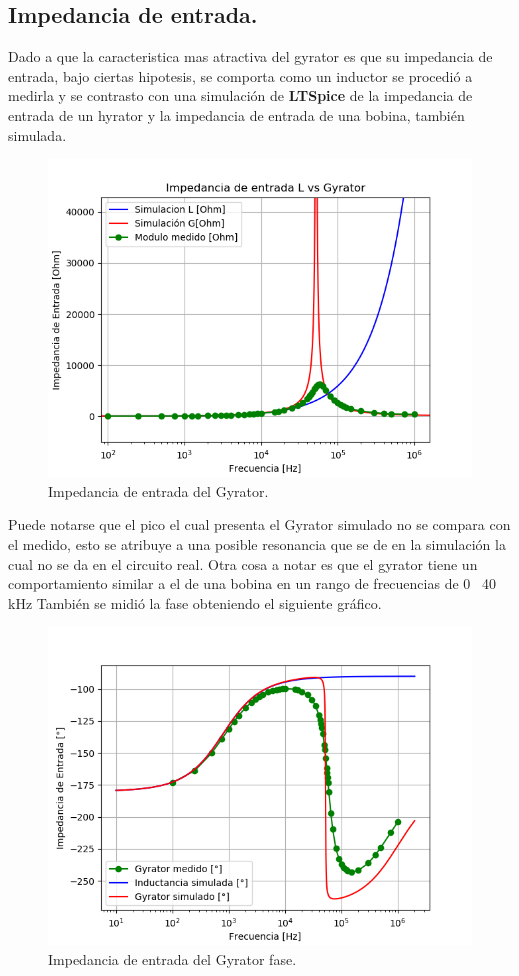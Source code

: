 \documentclass[a4paper]{article}
\begin{document}
\subsection{Impedancia de entrada.}
\label{section:zin}
Dado a que la caracteristica mas atractiva del gyrator es que su impedancia de entrada, bajo ciertas hipotesis, se comporta como un inductor se procedió a medirla y se contrasto con una simulación de \textbf{LTSpice} de la impedancia de entrada de un hyrator y la impedancia de entrada de una bobina, también simulada.

\begin{figure}[H]	
	\centering
	\includegraphics[width=\textwidth]{ImagenesEj2/ZinG.png}
	\caption{Impedancia de entrada del Gyrator.}
	\label{fig:ZinG}
\end{figure}
Puede notarse que el pico el cual presenta el Gyrator simulado no se compara con el medido, esto se atribuye a una posible resonancia que se de en la simulación la cual no se da en el circuito real. Otra cosa a notar es que el gyrator tiene un comportamiento similar a el de una bobina en un rango de frecuencias de 0 ~40 kHz
También se midió la fase obteniendo el siguiente gráfico.
\begin{figure}[H]	
	\centering
	\includegraphics[width=\textwidth]{ImagenesEj2/ZinGp.png}
	\caption{Impedancia de entrada del Gyrator fase.}
	\label{fig:ZinG}
\end{figure}
\end{document}
